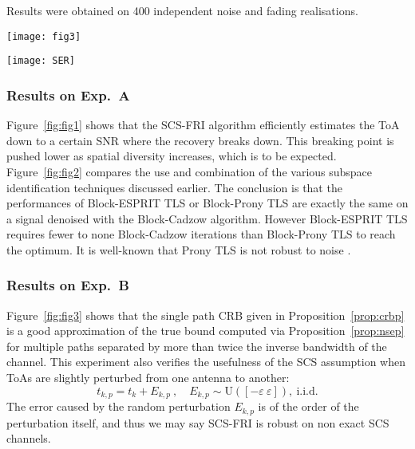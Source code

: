 \documentclass[journal,10pt]{IEEEtran}
\providecommand{\xp}[1]{\textsf{Exp.~{#1}}\ }
\begin{document}
Results were obtained on 400 independent noise and fading realisations.
\begin{figure*}[ht!]
  \centering
\texttt{[image: fig3]}
\caption{ (\xp B) This figure shows that the proposed algorithms behave as expected in the presence of ToA mismatches between antennas. Part (b) motivates the separability assumption to compute the CRB of paths located more than $2T$ apart, while Part (a) shows its inadequacy for a smaller delay $T$. The ``true'' estimate is obtained via Monte-Carlo simulations.}
\label{fig:fig3}
\end{figure*}

\begin{figure*}[ht!]
  \centering
\texttt{[image: SER]}
\caption{ (\xp C) Using the SCS property, the SER is decreased by a factor $5$ above $10$dB of SNR compared to the conventional non-parametric approach. Sparsity alone provides a significant SER improvement, which shall be combined with the common support property below $30$dB of SNR. At very high SNR, independent channel estimation across antennas become preferable as the channels only approximately have the common support property. However, below $15$dB of SNR the effect of this approximation are undetectable. Another advantage of SCS-FRI is the reduction of pilots, it allows to halve their number while retaining performances superior to lowpass interpolation.}
\label{fig:fig4}
\end{figure*}
\subsubsection{Results on \xp A}
Figure~\ref{fig:fig1} shows that the SCS-FRI algorithm efficiently estimates the ToA down to a certain SNR where the recovery breaks down. This breaking point is pushed lower as spatial diversity increases, which is to be expected. Figure~\ref{fig:fig2} compares the use and combination of the various subspace identification techniques discussed earlier. The conclusion is that the performances of Block-ESPRIT TLS or Block-Prony TLS are exactly the same on a signal denoised with the Block-Cadzow algorithm. However Block-ESPRIT TLS requires fewer to none Block-Cadzow iterations than Block-Prony TLS to reach the optimum. It is well-known that Prony TLS is not robust to noise \cite{Blu2008,Tufts1982}.
\subsubsection{Results on \xp B}
Figure~\ref{fig:fig3} shows that the single path CRB given in Proposition~\ref{prop:crbp} is a good approximation of the true bound computed via Proposition~\ref{prop:nsep} for multiple paths separated by more than twice the inverse bandwidth of the channel. This experiment also verifies the usefulness of the SCS assumption when ToAs are slightly perturbed from one antenna to another: 
$$t_{k,p}=t_k+E_{k,p}\ ,\quad E_{k,p} \sim \mathrm U([-\varepsilon\ \varepsilon]),\ \text{i.i.d.}$$
The error caused by the random perturbation $E_{k,p}$ is of the order of the perturbation itself, and thus we may say SCS-FRI is robust on non exact SCS channels.
\end{document}
